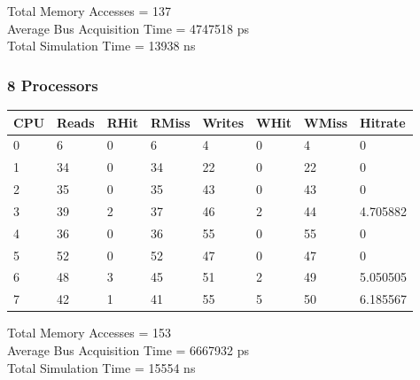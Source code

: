 \documentclass[]{article}
\begin{document}
Total Memory Accesses = 137\\
Average Bus Acquisition Time = 4747518 ps\\
Total Simulation Time = 13938 ns\\

\subsubsection{8 Processors}

\begin{table}[H]
	\begin{tabular}{|l|l|l|l|l|l|l|l|}
		\hline
		\textbf{CPU} & \textbf{Reads} & \textbf{RHit} & \textbf{RMiss} & \textbf{Writes} & \textbf{WHit} & \textbf{WMiss} & \textbf{Hitrate} \\ \hline
		0            & 6              & 0             & 6              & 4               & 0             & 4              & 0                \\ \hline
		1            & 34             & 0             & 34             & 22              & 0             & 22             & 0                \\ \hline
		2            & 35             & 0             & 35             & 43              & 0             & 43             & 0                \\ \hline
		3            & 39             & 2             & 37             & 46              & 2             & 44             & 4.705882         \\ \hline
		4            & 36             & 0             & 36             & 55              & 0             & 55             & 0                \\ \hline
		5            & 52             & 0             & 52             & 47              & 0             & 47             & 0                \\ \hline
		6            & 48             & 3             & 45             & 51              & 2             & 49             & 5.050505         \\ \hline
		7            & 42             & 1             & 41             & 55              & 5             & 50             & 6.185567         \\ \hline
	\end{tabular}
\end{table}

Total Memory Accesses = 153\\
Average Bus Acquisition Time = 6667932 ps\\
Total Simulation Time = 15554 ns\\
\end{document}
